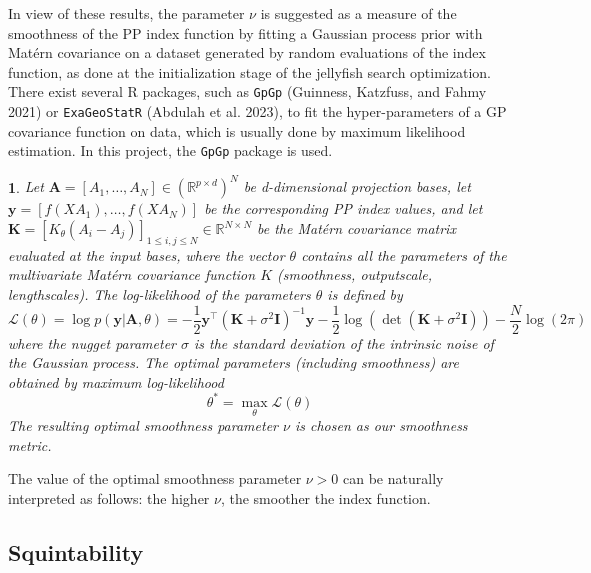 \documentclass[
  12pt,
]{interact}
\theoremstyle{plain}
\newtheorem{defn}{\protect\definitionname}
\providecommand{\definitionname}{Definition}
\begin{document}
In view of these results, the parameter \(\nu\) is suggested as a
measure of the smoothness of the PP index function by fitting a Gaussian
process prior with Matérn covariance on a dataset generated by random
evaluations of the index function, as done at the initialization stage
of the jellyfish search optimization. There exist several R packages,
such as \texttt{GpGp} (Guinness, Katzfuss, and Fahmy 2021) or
\texttt{ExaGeoStatR} (Abdulah et al. 2023), to fit the hyper-parameters
of a GP covariance function on data, which is usually done by maximum
likelihood estimation. In this project, the \texttt{GpGp} package is
used.

\begin{defn}
Let $\mathbf{A}=[A_1, \ldots, A_N] \in (\mathbb{R}^{p \times d})^N$ be d-dimensional projection bases, let $\mathbf{y}=[f(XA_1),\ldots,f(XA_N)]$ be the corresponding PP index values, and let $\mathbf{K}=[K_\theta(A_{i}-A_{j})]_{1\leq i,j\leq N}\in\mathbb{R}^{N\times N}$ be the Matérn covariance matrix evaluated at the input bases, where the vector $\theta$ contains all the parameters of the multivariate Matérn covariance function $K$ (smoothness, outputscale, lengthscales). The log-likelihood of the parameters $\theta$ is defined by 
\begin{equation}
\mathcal{L}(\theta)=\log p(\mathbf{y}\left|\mathbf{A},\theta\right.)=-\frac{1}{2}\mathbf{y}^{\top}(\mathbf{K}+\sigma^{2}\mathbf{I})^{-1}\mathbf{y}-\frac{1}{2}\mathrm{\log}(\det(\mathbf{K}+\sigma^{2}\mathbf{I}))-\frac{N}{2}\log(2\pi)\, \label{eq:gp_log_likelihood}
\end{equation}
where the nugget parameter $\sigma$ is the standard deviation of the intrinsic noise of the Gaussian process.
The optimal parameters (including smoothness) are obtained by maximum log-likelihood
\begin{equation}
\theta^* = \underset{\theta}{\max}\mathcal{L}(\theta)
\end{equation}
The resulting optimal smoothness parameter $\nu$ is chosen as our smoothness metric.
\end{defn}

The value of the optimal smoothness parameter \(\nu>0\) can be naturally
interpreted as follows: the higher \(\nu\), the smoother the index
function.

\subsection{Squintability}\label{sec-squintability}
\end{document}

